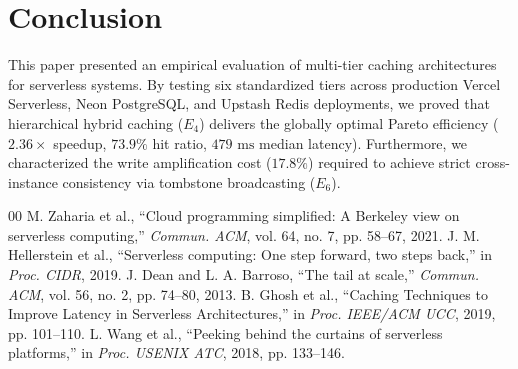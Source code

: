 \documentclass[conference]{IEEEtran}
\begin{document}
\section{Conclusion}
This paper presented an empirical evaluation of multi-tier caching architectures for serverless systems. By testing six standardized tiers across production Vercel Serverless, Neon PostgreSQL, and Upstash Redis deployments, we proved that hierarchical hybrid caching ($E_4$) delivers the globally optimal Pareto efficiency ($2.36\times$ speedup, $73.9\%$ hit ratio, $479\text{ ms}$ median latency). Furthermore, we characterized the write amplification cost ($17.8\%$) required to achieve strict cross-instance consistency via tombstone broadcasting ($E_6$).

\begin{thebibliography}{00}
 M. Zaharia et al., ``Cloud programming simplified: A Berkeley view on serverless computing,'' \textit{Commun. ACM}, vol. 64, no. 7, pp. 58--67, 2021.
 J. M. Hellerstein et al., ``Serverless computing: One step forward, two steps back,'' in \textit{Proc. CIDR}, 2019.
 J. Dean and L. A. Barroso, ``The tail at scale,'' \textit{Commun. ACM}, vol. 56, no. 2, pp. 74--80, 2013.
 B. Ghosh et al., ``Caching Techniques to Improve Latency in Serverless Architectures,'' in \textit{Proc. IEEE/ACM UCC}, 2019, pp. 101--110.
 L. Wang et al., ``Peeking behind the curtains of serverless platforms,'' in \textit{Proc. USENIX ATC}, 2018, pp. 133--146.
\end{thebibliography}
\end{document}
